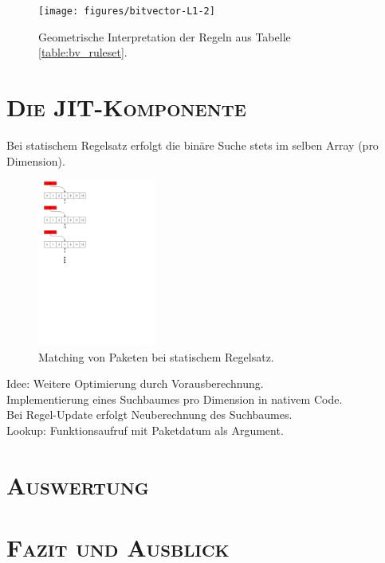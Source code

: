 \documentclass[xcolor=x11names,compress]{beamer}
\renewcommand{\(}{\begin{columns}}
\renewcommand{\)}{\end{columns}}
\newcommand{\<}[1]{\begin{column}{#1}}
\renewcommand{\>}{\end{column}}
\begin{document}
\begin{frame}
  \begin{figure}
  \centering
  \texttt{[image: figures/bitvector-L1-2]}
  \caption{Geometrische Interpretation der Regeln aus Tabelle \ref{table:bv_ruleset}.}
  \label{fig:bv-normal}
  \end{figure}
\end{frame}

\section{\scshape Die JIT-Komponente}
\begin{frame}
  Bei statischem Regelsatz erfolgt die binäre Suche stets im selben Array (pro Dimension).\\
  \begin{figure}
  \centering
  \includegraphics[height=5.5cm]{figures/matching_process}
  \caption{Matching von Paketen bei statischem Regelsatz.}
  \label{fig:matching-normal}
  \end{figure}
\end{frame}

\begin{frame}
  Idee: Weitere Optimierung durch Vorausberechnung.\\
  Implementierung eines Suchbaumes pro Dimension in nativem Code.\\
  Bei Regel-Update erfolgt Neuberechnung des Suchbaumes.\\
  Lookup: Funktionsaufruf mit Paketdatum als Argument.
\end{frame}

\section{\scshape Auswertung}
\begin{frame}
\end{frame}

\section{\scshape Fazit und Ausblick}
\begin{frame}
\end{frame}
\end{document}
